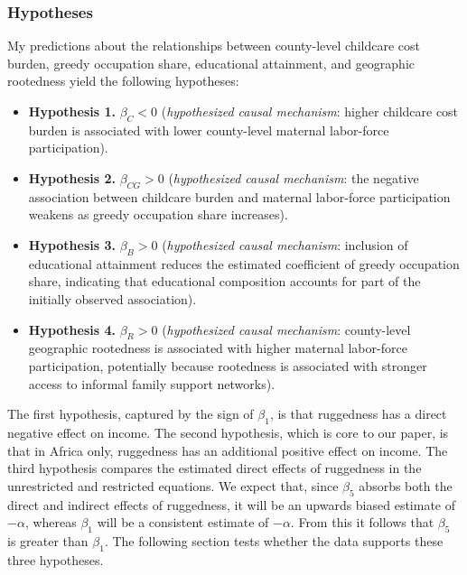 \documentclass[
  letterpaper,
  DIV=11,
  numbers=noendperiod]{scrartcl}
\providecommand{\tightlist}{%
  \setlength{\itemsep}{0pt}\setlength{\parskip}{0pt}}
\begin{document}
\subsubsection{Hypotheses}\label{hypotheses}

My predictions about the relationships between county-level childcare
cost burden, greedy occupation share, educational attainment, and
geographic rootedness yield the following hypotheses:

\begin{itemize}
\tightlist
\item
  \textbf{Hypothesis 1.} \(\beta_{C} < 0\) (\emph{hypothesized causal
  mechanism}: higher childcare cost burden is associated with lower
  county-level maternal labor-force participation).
\item
  \textbf{Hypothesis 2.} \(\beta_{CG} > 0\) (\emph{hypothesized causal
  mechanism}: the negative association between childcare burden and
  maternal labor-force participation weakens as greedy occupation share
  increases).
\item
  \textbf{Hypothesis 3.} \(\beta_{B} > 0\) (\emph{hypothesized causal
  mechanism}: inclusion of educational attainment reduces the estimated
  coefficient of greedy occupation share, indicating that educational
  composition accounts for part of the initially observed association).
\item
  \textbf{Hypothesis 4.} \(\beta_{R} > 0\) (\emph{hypothesized causal
  mechanism}: county-level geographic rootedness is associated with
  higher maternal labor-force participation, potentially because
  rootedness is associated with stronger access to informal family
  support networks).
\end{itemize}

The first hypothesis, captured by the sign of \(\beta_1\), is that
ruggedness has a direct negative effect on income. The second
hypothesis, which is core to our paper, is that in Africa only,
ruggedness has an additional positive effect on income. The third
hypothesis compares the estimated direct effects of ruggedness in the
unrestricted and restricted equations. We expect that, since \(\beta_5\)
absorbs both the direct and indirect effects of ruggedness, it will be
an upwards biased estimate of \(-\alpha\), whereas \(\beta_1\) will be a
consistent estimate of \(-\alpha\). From this it follows that
\(\beta_5\) is greater than \(\beta_1\). The following section tests
whether the data supports these three hypotheses.
\end{document}
